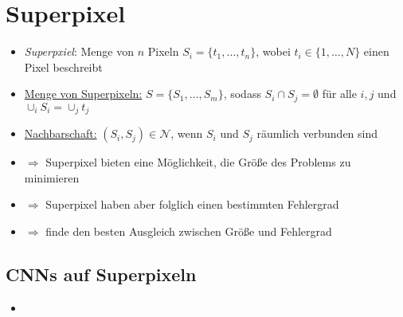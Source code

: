 \section{Superpixel}

\begin{itemize}
  \item \emph{Superpxiel}: Menge von $n$ Pixeln $S_i = \lbrace t_1, \ldots, t_n \rbrace$, wobei $t_i \in \lbrace 1, \ldots, N \rbrace$ einen Pixel beschreibt
  \item \underline{Menge von Superpixeln:} $S = \lbrace S_1, \ldots, S_m \rbrace$, sodass $S_i \cap S_j = \emptyset$ für alle $i, j$ und $\cup_i S_i = \cup_j t_j$
  \item \underline{Nachbarschaft:} $(S_i, S_j) \in \mathcal{N}$, wenn $S_i$ und $S_j$ räumlich verbunden sind
  \item $\Rightarrow$ Superpixel bieten eine Möglichkeit, die Größe des Problems zu minimieren
  \item $\Rightarrow$ Superpixel haben aber folglich einen bestimmten Fehlergrad
  \item $\Rightarrow$ finde den besten Ausgleich zwischen Größe und Fehlergrad
\end{itemize}

\subsection{CNNs auf Superpixeln}

\begin{itemize}
  \item {}
\end{itemize}
